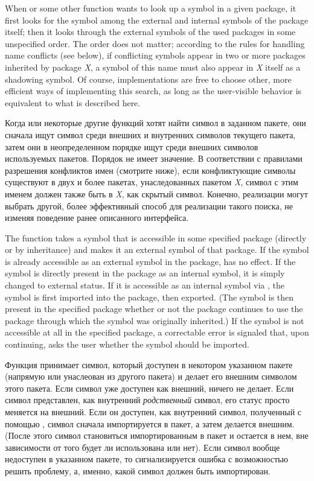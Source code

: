 When  or some other function wants to look up a symbol in a
given package, it first looks for the symbol among the external and
internal symbols of the package itself; then it looks through the
external symbols of the used packages in some unspecified order.  The
order does not matter; according to the rules for handling name
conflicts (see below), if conflicting symbols appear in two or more
packages inherited by package \emph{X}, a symbol of this name must also appear
in \emph{X} itself as a shadowing symbol.  Of course, implementations are free
to choose other, more efficient ways of implementing this search, as
long as the user-visible behavior is equivalent to what is described
here.

Когда  или некоторые другие функций хотят найти символ в заданном
пакете, они сначала ищут символ среди внешних и внутренних символов текущего
пакета, затем они в неопределенном порядке ищут среди внешних символов
используемых пакетов. Порядок не имеет значение. В соответствии с правилами
разрешения конфликтов имен (смотрите ниже), если конфликтующие символы существуют
в двух и более пакетах, унаследованных пакетом \emph{X}, символ с этим именем
должен также быть в \emph{X}, как скрытый символ. Конечно, реализации могут
выбрать другой, более эффективный способ для реализации такого поиска, не
изменяя поведение ранее описанного интерфейса.

The function  takes a symbol that is accessible in some
specified package (directly or by inheritance) and makes it an external
symbol of that package.  If the symbol is already accessible as an
external symbol in the package,  has no effect.  If the symbol
is directly present in the package as an internal symbol, it is simply
changed to external status.  If it is accessible as an internal symbol
via , the symbol is first imported into the package, then
exported.  (The symbol is then present in the specified package
whether or not the package
continues to use the package through which the symbol was originally
inherited.)  If the symbol is not
accessible at all in the specified package, a correctable error is
signaled that, upon continuing, asks the user whether the symbol
should be imported.

Функция  принимает символ, который доступен в некотором указанном
пакете (напрямую или унаслеован из другого пакета) и делает его внешним символом
этого пакета. Если символ уже доступен как внешний,  ничего не
делает. Если символ представлен, как внутренний \emph{родственный} символ, его
статус просто меняется на внешний. Если он доступен, как внутренний символ,
полученный с помощью , символ сначала импортируется в пакет, а
затем делается внешним. (После этого символ становиться импортированным в пакет
и остается в нем, вне зависимости от того будет ли использована
 или нет). Если символ вообще недоступен в указанном пакете,
то сигнализируется ошибка с возможностью решить проблему, а, именно, какой
символ должен быть импортирован.

